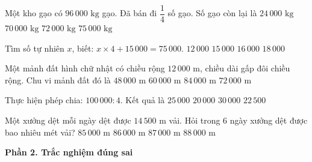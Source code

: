 \begin{ex} %
Một kho gạo có $96\,000\text{ kg}$ gạo. Đã bán đi $\dfrac{1}{4}$ số gạo. Số gạo còn lại là
\choice
{$24\,000\text{ kg}$}
{$70\,000\text{ kg}$}
{\True $72\,000\text{ kg}$}
{$75\,000\text{ kg}$}
\end{ex}

\begin{ex} %
Tìm số tự nhiên $x$, biết: $x \times 4 + 15\,000 = 75\,000$.
\choice
{$12\,000$}
{\True $15\,000$}
{$16\,000$}
{$18\,000$}
\end{ex}

\begin{ex} %
Một mảnh đất hình chữ nhật có chiều rộng $12\,000\text{ m}$, chiều dài gấp đôi chiều rộng. Chu vi mảnh đất đó là
\choice
{$48\,000\text{ m}$}
{$60\,000\text{ m}$}
{$84\,000\text{ m}$}
{\True $72\,000\text{ m}$}
\end{ex}

\begin{ex} %
Thực hiện phép chia: $100\,000 : 4$. Kết quả là
\choice
{\True $25\,000$}
{$20\,000$}
{$30\,000$}
{$22\,500$}
\end{ex}

\begin{ex} %
Một xưởng dệt mỗi ngày dệt được $14\,500\text{ m}$ vải. Hỏi trong 6 ngày xưởng dệt được bao nhiêu mét vải?
\choice
{$85\,000\text{ m}$}
{$86\,000\text{ m}$}
{\True $87\,000\text{ m}$}
{$88\,000\text{ m}$}
\end{ex}

\textbf{Phần 2. Trắc nghiệm đúng sai}

